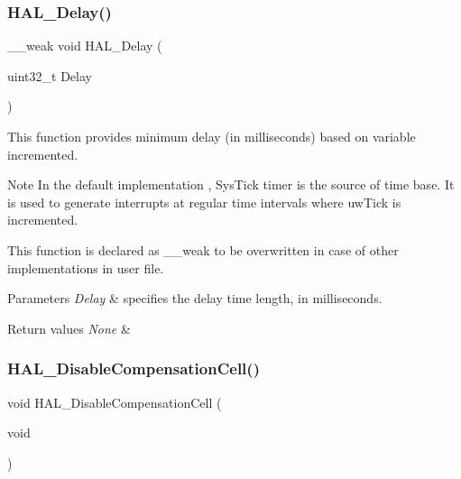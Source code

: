 \subsubsection{\texorpdfstring{H\+A\+L\+\_\+\+Delay()}{HAL\_Delay()}}
{\footnotesize\ttfamily \+\_\+\+\_\+weak void H\+A\+L\+\_\+\+Delay (\begin{DoxyParamCaption}\item[{uint32\+\_\+t}]{Delay }\end{DoxyParamCaption})}



This function provides minimum delay (in milliseconds) based on variable incremented. 

\begin{DoxyNote}{Note}
In the default implementation , Sys\+Tick timer is the source of time base. It is used to generate interrupts at regular time intervals where uw\+Tick is incremented. 

This function is declared as \+\_\+\+\_\+weak to be overwritten in case of other implementations in user file. 
\end{DoxyNote}

\begin{DoxyParams}{Parameters}
{\em Delay} & specifies the delay time length, in milliseconds. \\
\hline
\end{DoxyParams}

\begin{DoxyRetVals}{Return values}
{\em None} & \\
\hline
\end{DoxyRetVals}
\mbox{\label{group___h_a_l___exported___functions___group2_ga653f1166b0e37afd40372550d806e667}} 
\subsubsection{\texorpdfstring{H\+A\+L\+\_\+\+Disable\+Compensation\+Cell()}{HAL\_DisableCompensationCell()}}
{\footnotesize\ttfamily void H\+A\+L\+\_\+\+Disable\+Compensation\+Cell (\begin{DoxyParamCaption}\item[{void}]{ }\end{DoxyParamCaption})}



